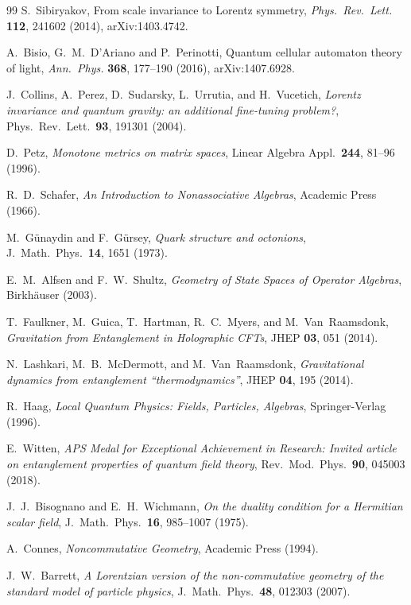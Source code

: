\documentclass[12pt]{article}
\theoremstyle{definition}
\theoremstyle{remark}
\begin{document}
\begin{thebibliography}{99}
S.~Sibiryakov, From scale invariance to Lorentz symmetry, \emph{Phys.\ Rev.\ Lett.} \textbf{112}, 241602 (2014), arXiv:1403.4742.

A.~Bisio, G.~M.~D'Ariano and P.~Perinotti, Quantum cellular automaton theory of light, \emph{Ann.\ Phys.} \textbf{368}, 177--190 (2016), arXiv:1407.6928.

J.~Collins, A.~Perez, D.~Sudarsky, L.~Urrutia, and H.~Vucetich, \emph{Lorentz invariance and quantum gravity: an additional fine-tuning problem?}, Phys.\ Rev.\ Lett.\ \textbf{93}, 191301 (2004).

D.~Petz, \emph{Monotone metrics on matrix spaces}, Linear Algebra Appl.\ \textbf{244}, 81--96 (1996).

R.~D.~Schafer, \emph{An Introduction to Nonassociative Algebras}, Academic Press (1966).

M.~G\"unaydin and F.~G\"ursey, \emph{Quark structure and octonions}, J.\ Math.\ Phys.\ \textbf{14}, 1651 (1973).

E.~M.~Alfsen and F.~W.~Shultz, \emph{Geometry of State Spaces of Operator Algebras}, Birkh\"auser (2003).

T.~Faulkner, M.~Guica, T.~Hartman, R.~C.~Myers, and M.~Van~Raamsdonk, \emph{Gravitation from Entanglement in Holographic CFTs}, JHEP \textbf{03}, 051 (2014).

N.~Lashkari, M.~B.~McDermott, and M.~Van~Raamsdonk, \emph{Gravitational dynamics from entanglement ``thermodynamics''}, JHEP \textbf{04}, 195 (2014).

R.~Haag, \emph{Local Quantum Physics: Fields, Particles, Algebras}, Springer-Verlag (1996).

E.~Witten, \emph{APS Medal for Exceptional Achievement in Research: Invited article on entanglement properties of quantum field theory}, Rev.\ Mod.\ Phys.\ \textbf{90}, 045003 (2018).

J.~J.~Bisognano and E.~H.~Wichmann, \emph{On the duality condition for a Hermitian scalar field}, J.\ Math.\ Phys.\ \textbf{16}, 985--1007 (1975).

A.~Connes, \emph{Noncommutative Geometry}, Academic Press (1994).

J.~W.~Barrett, \emph{A Lorentzian version of the non-commutative geometry of the standard model of particle physics}, J.\ Math.\ Phys.\ \textbf{48}, 012303 (2007).


\end{thebibliography}
\end{document}
